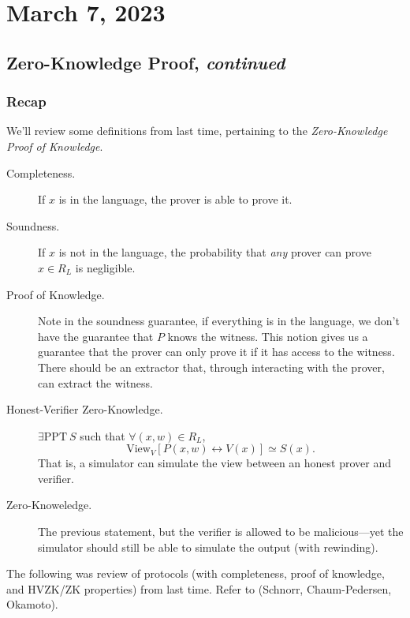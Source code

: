 \section{March 7, 2023}
\label{20230307}
\subsection{Zero-Knowledge Proof, \emph{continued}}
\subsubsection{Recap}
We'll review some definitions from last time, pertaining to the \emph{Zero-Knowledge Proof of Knowledge}.
\begin{description}
    \item[Completeness.] If $x$ is in the language, the prover is able to prove it.
    \item[Soundness.] If $x$ is not in the language, the probability that \emph{any} prover can prove $x\in R_L$ is negligible.
    \item[Proof of Knowledge.] Note in the soundness guarantee, if everything is in the language, we don't have the guarantee that $P$ knows the witness. This notion gives us a guarantee that the prover can only prove it if it has access to the witness. There should be an extractor that, through interacting with the prover, can extract the witness.
    \item[Honest-Verifier Zero-Knowledge.] $\exists \mathrm{PPT}\ S$ such that $\forall (x, w)\in R_L$,
        \[\mathrm{View}_V[P(x, w)\leftrightarrow V(x)]\simeq S(x).\]
        That is, a simulator can simulate the view between an honest prover and verifier.
    \item[Zero-Knoweledge.] The previous statement, but the verifier is allowed to be malicious---yet the simulator should still be able to simulate the output (with rewinding).
\end{description}

The following was review of protocols (with completeness, proof of knowledge, and HVZK/ZK properties) from last time. Refer to (Schnorr, Chaum-Pedersen, Okamoto).

